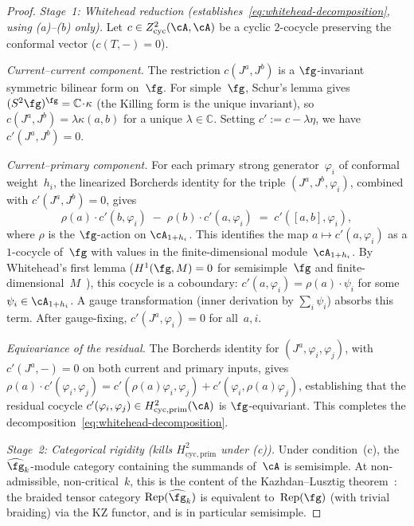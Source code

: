 \begin{proof}
\emph{Stage~1: Whitehead reduction
\textup{(}establishes~\eqref{eq:whitehead-decomposition},
using (a)--(b) only\textup{)}.}
Let $c \in Z^2_{\mathrm{cyc}}(\cA,\cA)$ be a cyclic
$2$-cocycle preserving the conformal vector ($c(T,-) = 0$).

\emph{Current--current component.}
The restriction $c(J^a, J^b)$ is a $\fg$-invariant symmetric
bilinear form on~$\fg$.  For simple~$\fg$, Schur's lemma
gives $(S^2\fg)^\fg = \mathbb{C}\!\cdot\!\kappa$
(the Killing form is the unique invariant), so
$c(J^a, J^b) = \lambda \kappa(a,b)$ for a unique
$\lambda \in \mathbb{C}$.
Setting $c' := c - \lambda\eta$, we have
$c'(J^a, J^b) = 0$.

\emph{Current--primary component.}
For each primary strong generator~$\varphi_i$ of conformal
weight~$h_i$, the linearized Borcherds identity for the
triple $(J^a, J^b, \varphi_i)$, combined with
$c'(J^a, J^b) = 0$, gives
\[
\rho(a)\!\cdot\! c'(b, \varphi_i)
\;-\; \rho(b)\!\cdot\! c'(a, \varphi_i)
\;=\; c'([a,b], \varphi_i),
\]
where $\rho$ is the $\fg$-action on $\cA_{1+h_i}$.
This identifies the map $a \mapsto c'(a, \varphi_i)$ as a
$1$-cocycle of~$\fg$ with values in the finite-dimensional
module~$\cA_{1+h_i}$.
By Whitehead's first lemma ($H^1(\fg, M) = 0$ for
semisimple~$\fg$ and finite-dimensional~$M$~\cite{Weibel94}),
this cocycle is a coboundary:
$c'(a, \varphi_i) = \rho(a) \!\cdot\! \psi_i$ for some
$\psi_i \in \cA_{1+h_i}$.
A gauge transformation (inner derivation by
$\sum_i \psi_i$) absorbs this term.  After gauge-fixing,
$c'(J^a, \varphi_i) = 0$ for all~$a, i$.

\emph{Equivariance of the residual.}
The Borcherds identity for $(J^a, \varphi_i, \varphi_j)$,
with $c'(J^a, -) = 0$ on both current and primary inputs,
gives
$\rho(a) \!\cdot\! c'(\varphi_i, \varphi_j)
= c'(\rho(a)\varphi_i, \varphi_j) +
c'(\varphi_i, \rho(a)\varphi_j)$,
establishing that the residual cocycle
$c'(\varphi_i, \varphi_j) \in H^2_{\mathrm{cyc,prim}}(\cA)$
is $\fg$-equivariant.
This completes the
decomposition~\eqref{eq:whitehead-decomposition}.

\smallskip\noindent
\emph{Stage~2: Categorical rigidity
\textup{(}kills\/ $H^2_{\mathrm{cyc,prim}}$ under\/ (c)\textup{)}.}
Under condition~(c), the~$\widehat{\fg}_k$-module category
containing the summands of~$\cA$ is semisimple.  At
non-admissible, non-critical~$k$, this is the content of the
Kazhdan--Lusztig theorem~\cite{KL93}: the braided tensor
category $\mathrm{Rep}(\widehat{\fg}_k)$ is equivalent
to~$\mathrm{Rep}(\fg)$ (with trivial braiding) via the KZ
functor, and is in particular semisimple.


\end{proof}
